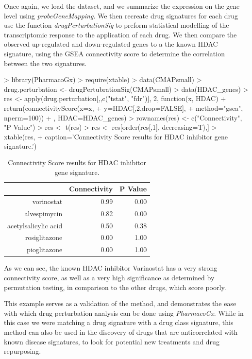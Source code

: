 \documentclass[11pt]{article}
\begin{document}
Once again, we load the dataset, and we summarize the expression on the gene level using \textit{probeGeneMapping}. We then recreate drug signatures for each drug use the function \textit{drugPerturbationSig} to preform statistical modelling of the transcriptomic response to the application of each drug. We then compare the observed up-regulated and down-regulated genes to a the known HDAC signature, using the GSEA connectivity score to determine the correlation between the two signatures. 

\begin{Schunk}
\begin{Sinput}
>   library(PharmacoGx)
>   require(xtable)
>   data(CMAPsmall)
>   drug.perturbation <- drugPertubrationSig(CMAPsmall)
>   data(HDAC_genes)
>   res <- apply(drug.perturbation[,,c("tstat", "fdr")], 2, function(x, HDAC){ 
+ 	    return(connectivityScore(x=x, 
+ 	                             y=HDAC[,2,drop=FALSE], 
+ 	                             method="gsea", nperm=100))
+ 	}, HDAC=HDAC_genes)
>   rownames(res) <- c("Connectivity", "P Value")
>   res <- t(res)
>   res <- res[order(res[,1], decreasing=T),]
>   xtable(res, 
+     caption='Connectivity Score results for HDAC inhibitor gene signature.')
\end{Sinput}
\begin{table}[ht]
\centering
\begin{tabular}{rrr}
  \hline
 & Connectivity & P Value \\ 
  \hline
vorinostat & 0.99 & 0.00 \\ 
  alvespimycin & 0.82 & 0.00 \\ 
  acetylsalicylic acid & 0.50 & 0.38 \\ 
  rosiglitazone & 0.00 & 1.00 \\ 
  pioglitazone & 0.00 & 1.00 \\ 
   \hline
\end{tabular}
\caption{Connectivity Score results for HDAC inhibitor gene signature.} 
\end{table}\end{Schunk}
As we can see, the known HDAC inhibitor Varinostat has a very strong connectivity score, as well as a very high significance as determined by permutation testing, in comparison to the other drugs, which score poorly. 

This example serves as a validation of the method, and demonstrates the ease with which drug perturbation analysis can be done using \textit{PharmacoGx}. While in this case we were matching a drug signature with a drug class signature, this method can also be used in the discovery of drugs that are anticorrelated with known disease signatures, to look for potential new treatments and drug repurposing. 
\end{document}
